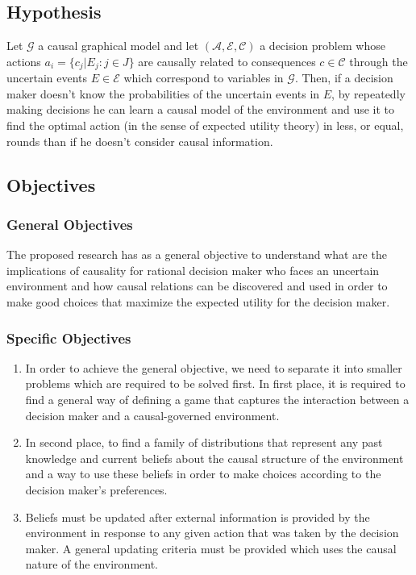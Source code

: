 \documentclass[english,letterpaper,12pt,final]{article}
\theoremstyle{definition}
\begin{document}
	\subsection{Hypothesis}
	Let $\mathcal{G}$ a causal graphical model and let $(\mathcal{A},\mathcal{E},\mathcal{C})$ a decision problem whose actions $a_i = \{ c_j | E_j : j \in J \}$  are causally related to consequences $c \in \mathcal{C}$ through the uncertain events $E \in \mathcal{E}$ which correspond to variables in $\mathcal{G}$. Then, if a decision maker doesn't know the probabilities of the uncertain events in $E$, by repeatedly making decisions he can learn a causal model of the environment and use it to find the optimal action (in the sense of expected utility theory) in less, or equal, rounds than if he doesn't consider causal information.
	\subsection{Objectives}
		\subsubsection{General Objectives}
			The proposed research has as a general objective to understand what are the implications of causality for rational decision maker who faces an uncertain environment and how causal relations can be discovered and used in order to make good choices that maximize the expected utility for the decision maker.
		\subsubsection{Specific Objectives}
		\begin{enumerate}
		\item In order to achieve the general objective, we need to separate it into smaller problems which are required to be solved first. In first place, it is required to find a general way of defining a game that captures the interaction between a decision maker and a causal-governed environment.
		
		\item In second place, to find a family of distributions that represent any past knowledge and current beliefs about the causal structure of the environment and a way to use these beliefs in order to make choices according to the decision maker's preferences. 
		
		\item Beliefs must be updated after external information is provided by the environment in response to any given action that was taken by the decision maker. A general updating criteria must be provided which uses the causal nature of the environment.
		\end{enumerate}
		
\end{document}
